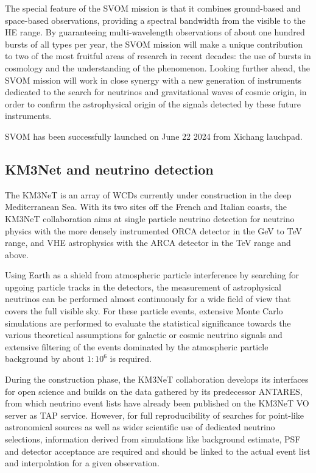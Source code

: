 \documentclass[11pt,a4paper]{ivoa}
\begin{document}
The special feature of the \gls{SVOM} mission is that it combines ground-based and space-based observations,
providing a spectral bandwidth from the visible to the \gls{HE} range. By guaranteeing multi-wavelength
observations of about one hundred bursts of all types per year, the \gls{SVOM} mission will make a unique contribution
to two of the most fruitful areas of research in recent decades: the use of bursts in cosmology and the understanding
of the phenomenon. Looking further ahead, the \gls{SVOM} mission will work in close synergy with a new generation of
instruments dedicated to the search for neutrinos and gravitational waves of cosmic origin, in order to confirm
the astrophysical origin of the signals detected by these future instruments.

\gls{SVOM} has been successfully launched on June 22 2024 from  Xichang lauchpad.


\subsection{KM3Net and neutrino detection}

The \gls{KM3NeT} is an array of \gls{WCD}s currently under construction in the deep
Mediterranean Sea. With its two sites off the French and Italian coasts, the \gls{KM3NeT} collaboration aims at single particle
neutrino detection for neutrino physics with the more densely instrumented \gls{ORCA} detector in the GeV to TeV range, and
\gls{VHE} astrophysics with the \gls{ARCA} detector in the TeV range and above.

Using Earth as a shield from atmospheric particle interference by searching for upgoing particle tracks in the detectors,
the measurement of astrophysical neutrinos can be performed almost continuously for a wide field of view that covers the
full visible sky. For these particle events, extensive Monte Carlo simulations are performed to evaluate the
statistical significance towards the various theoretical assumptions for galactic or cosmic neutrino signals and extensive filtering of the events dominated by the atmospheric particle background by about $1:10^{6}$ is required.

During the construction phase, the \gls{KM3NeT} collaboration develops its interfaces for open science and builds on the data
gathered by its predecessor \gls{ANTARES}, from which neutrino event lists have already been published on the \gls{KM3NeT} \gls{VO} server
as \gls{TAP} service. However, for full reproducibility of searches for point-like astronomical sources as well as wider scientific use of dedicated neutrino selections,
information derived from simulations like background estimate, \gls{PSF} and detector acceptance are required and should be linked
to the actual event list and interpolation for a given observation.
\end{document}
